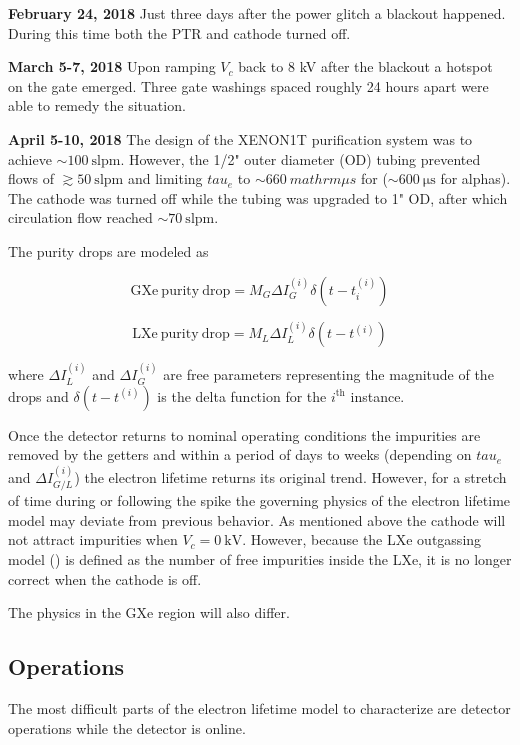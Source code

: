 {\textbf{February 24, 2018}  Just three days after the power glitch a blackout happened.  During this time both the PTR and cathode turned
off.

\textbf{March 5-7, 2018}  Upon ramping $V_c$ back to 8 kV after the blackout a hotspot on the gate emerged.  Three gate washings spaced
roughly 24 hours apart were able to remedy the situation.

\textbf{April 5-10, 2018}  The design of the XENON1T purification system was to achieve ${\sim} 100\ \mathrm{slpm}$.  However, the
1/2" outer diameter (OD) tubing prevented flows of $\gtrsim 50\ \mathrm{slpm}$ and limiting $tau_e$ to ${\sim} 660\ mathrm{\mu s}$ for
\metakr (${\sim} 600\ \mathrm{\mu s}$ for alphas).  The cathode was turned off while the tubing was upgraded to 1" OD, after which
circulation flow reached ${\sim} 70\ \mathrm{slpm}$.

The purity drops are modeled as

\begin{equation}
\mathrm{GXe\ purity\ drop} = M_G \Delta I_G^{(i)} \delta (t - t_i^{(i)})
\end{equation}

\begin{equation}
\mathrm{LXe\ purity\ drop} = M_L \Delta I_L^{(i)} \delta (t - t^{(i)})
\end{equation}

\noindent where $\Delta I_L^{(i)}$ and $\Delta I_G^{(i)}$ are free parameters representing the magnitude of the drops and
$\delta (t - t^{(i)})$ is the delta function for the $i^{\mathrm{th}}$ instance.

Once the detector returns to nominal operating conditions the impurities are removed by the getters and within a period of days to weeks
(depending on $tau_e$ and $\Delta I_{G/L}^{(i)}$) the electron lifetime returns its original trend.  However, for a stretch of time during
or following the spike the governing physics of the electron lifetime model may deviate from previous behavior.  As mentioned above the
cathode will not
attract impurities when $V_c = 0\ \mathrm{kV}$.  However, because the LXe outgassing model
() is defined as the number of free impurities
inside the LXe, it is no longer correct when the cathode is off.

The physics in the GXe region will also differ.



\subsection{Operations}
\label{subsec:electron_lifetime_model_ops}
The most difficult parts of the electron lifetime model to characterize are detector operations while the detector is online.



}
